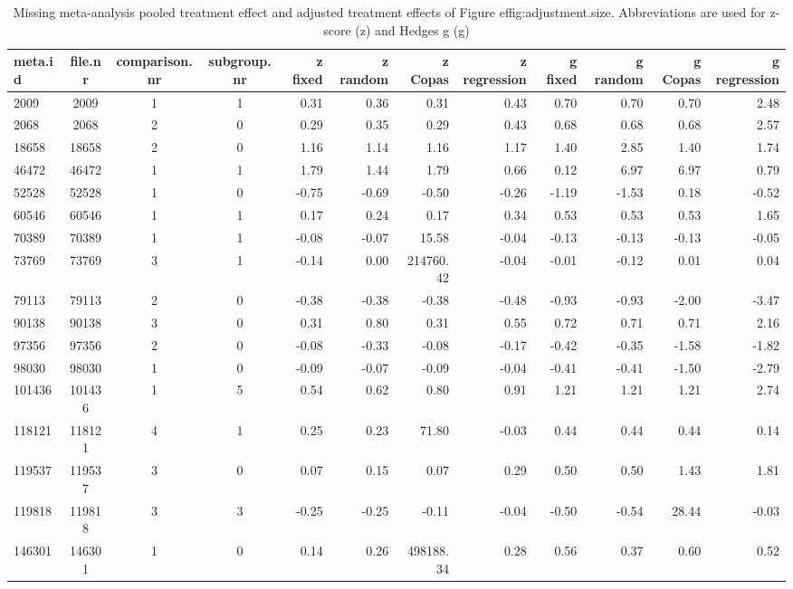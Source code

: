 \documentclass[11pt,a4paper,twoside]{book}\usepackage[]{graphicx}\usepackage[]{color}
\begin{document}
\begin{table}[ht]
\centering
\begingroup\tiny
\begin{tabular}{lcccrrrrrrrr}
  \hline
meta.id & file.nr & comparison.nr & subgroup.nr & z fixed & z random & z Copas & z regression & g fixed & g random & g Copas & g regression \\ 
  \hline
2009 & 2009 & 1 & 1 & 0.31 & 0.36 & 0.31 & 0.43 & 0.70 & 0.70 & 0.70 & 2.48 \\ 
  2068 & 2068 & 2 & 0 & 0.29 & 0.35 & 0.29 & 0.43 & 0.68 & 0.68 & 0.68 & 2.57 \\ 
  18658 & 18658 & 2 & 0 & 1.16 & 1.14 & 1.16 & 1.17 & 1.40 & 2.85 & 1.40 & 1.74 \\ 
  46472 & 46472 & 1 & 1 & 1.79 & 1.44 & 1.79 & 0.66 & 0.12 & 6.97 & 6.97 & 0.79 \\ 
  52528 & 52528 & 1 & 0 & -0.75 & -0.69 & -0.50 & -0.26 & -1.19 & -1.53 & 0.18 & -0.52 \\ 
  60546 & 60546 & 1 & 1 & 0.17 & 0.24 & 0.17 & 0.34 & 0.53 & 0.53 & 0.53 & 1.65 \\ 
  70389 & 70389 & 1 & 1 & -0.08 & -0.07 & 15.58 & -0.04 & -0.13 & -0.13 & -0.13 & -0.05 \\ 
  73769 & 73769 & 3 & 1 & -0.14 & 0.00 & 214760.42 & -0.04 & -0.01 & -0.12 & 0.01 & 0.04 \\ 
  79113 & 79113 & 2 & 0 & -0.38 & -0.38 & -0.38 & -0.48 & -0.93 & -0.93 & -2.00 & -3.47 \\ 
  90138 & 90138 & 3 & 0 & 0.31 & 0.80 & 0.31 & 0.55 & 0.72 & 0.71 & 0.71 & 2.16 \\ 
  97356 & 97356 & 2 & 0 & -0.08 & -0.33 & -0.08 & -0.17 & -0.42 & -0.35 & -1.58 & -1.82 \\ 
  98030 & 98030 & 1 & 0 & -0.09 & -0.07 & -0.09 & -0.04 & -0.41 & -0.41 & -1.50 & -2.79 \\ 
  101436 & 101436 & 1 & 5 & 0.54 & 0.62 & 0.80 & 0.91 & 1.21 & 1.21 & 1.21 & 2.74 \\ 
  118121 & 118121 & 4 & 1 & 0.25 & 0.23 & 71.80 & -0.03 & 0.44 & 0.44 & 0.44 & 0.14 \\ 
  119537 & 119537 & 3 & 0 & 0.07 & 0.15 & 0.07 & 0.29 & 0.50 & 0.50 & 1.43 & 1.81 \\ 
  119818 & 119818 & 3 & 3 & -0.25 & -0.25 & -0.11 & -0.04 & -0.50 & -0.54 & 28.44 & -0.03 \\ 
  146301 & 146301 & 1 & 0 & 0.14 & 0.26 & 498188.34 & 0.28 & 0.56 & 0.37 & 0.60 & 0.52 \\ 
   \hline
\end{tabular}
\endgroup
\caption{Missing meta-analysis pooled treatment effect and adjusted treatment effects
             of Figure 
ef{fig:adjustment.size}. Abbreviations are used for z-score (z) and Hedges g (g)} 
\label{missing.differences}
\end{table}
\end{document}
